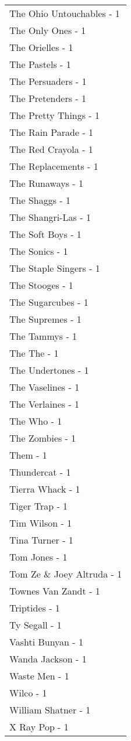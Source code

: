 \documentclass[
]{article}
\begin{document}
\begin{longtable}{l}
The Ohio Untouchables - 1 \\ 
The Only Ones - 1 \\ 
The Orielles - 1 \\ 
The Pastels - 1 \\ 
The Persuaders - 1 \\ 
The Pretenders - 1 \\ 
The Pretty Things - 1 \\ 
The Rain Parade - 1 \\ 
The Red Crayola - 1 \\ 
The Replacements - 1 \\ 
The Runaways - 1 \\ 
The Shaggs - 1 \\ 
The Shangri-Las - 1 \\ 
The Soft Boys - 1 \\ 
The Sonics - 1 \\ 
The Staple Singers - 1 \\ 
The Stooges - 1 \\ 
The Sugarcubes - 1 \\ 
The Supremes - 1 \\ 
The Tammys - 1 \\ 
The The - 1 \\ 
The Undertones - 1 \\ 
The Vaselines - 1 \\ 
The Verlaines - 1 \\ 
The Who - 1 \\ 
The Zombies - 1 \\ 
Them - 1 \\ 
Thundercat - 1 \\ 
Tierra Whack - 1 \\ 
Tiger Trap - 1 \\ 
Tim Wilson - 1 \\ 
Tina Turner - 1 \\ 
Tom Jones - 1 \\ 
Tom Ze \& Joey Altruda - 1 \\ 
Townes Van Zandt - 1 \\ 
Triptides - 1 \\ 
Ty Segall - 1 \\ 
Vashti Bunyan - 1 \\ 
Wanda Jackson - 1 \\ 
Waste Men - 1 \\ 
Wilco - 1 \\ 
William Shatner - 1 \\ 
X Ray Pop - 1 \\ 

\end{longtable}
\end{document}
